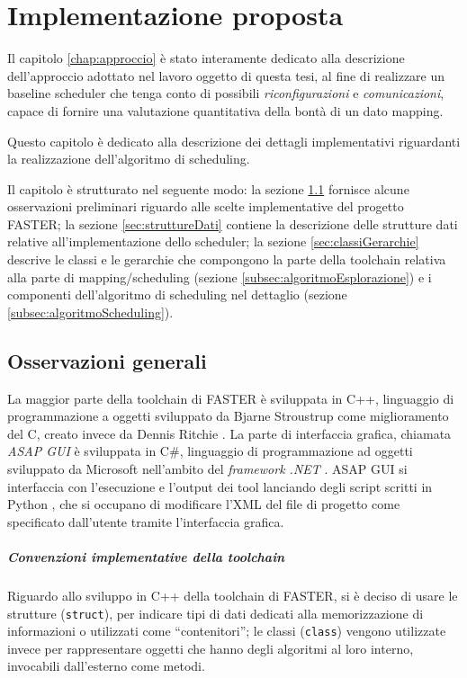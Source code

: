 \chapter{Implementazione proposta}
\label{chap:implementazione}
\vspace{1cm}
Il capitolo \ref{chap:approccio} è stato interamente dedicato alla descrizione 
dell'approccio adottato nel lavoro oggetto di questa tesi, al fine di 
realizzare un baseline scheduler che tenga conto di possibili 
\emph{riconfigurazioni} e \emph{comunicazioni}, capace di fornire una 
valutazione quantitativa della bontà di un dato mapping.

Questo capitolo è dedicato alla descrizione dei dettagli implementativi 
riguardanti la realizzazione dell'algoritmo di scheduling.

Il capitolo è strutturato nel seguente modo: la sezione 
\ref{sec:osservazioniGenerali} fornisce alcune osservazioni preliminari 
riguardo alle scelte implementative del progetto \ac{FASTER}; la sezione 
\ref{sec:struttureDati} contiene la descrizione delle strutture dati relative 
all'implementazione dello scheduler; la sezione \ref{sec:classiGerarchie} 
descrive le classi e le gerarchie che compongono la parte della toolchain 
relativa alla parte di mapping/scheduling (sezione 
\ref{subsec:algoritmoEsplorazione}) e i componenti dell'algoritmo di scheduling 
nel dettaglio (sezione \ref{subsec:algoritmoScheduling}).

\section{Osservazioni generali}
\label{sec:osservazioniGenerali}
La maggior parte della toolchain di \ac{FASTER} è sviluppata in C++, 
linguaggio di programmazione a oggetti sviluppato da Bjarne Stroustrup 
\cite{CppStroustrup} come miglioramento del C, creato invece da Dennis Ritchie 
\cite{CKernighanRitchie}. La parte di interfaccia grafica, chiamata \emph{ASAP 
GUI} è sviluppata in C\#, linguaggio di programmazione ad oggetti sviluppato da 
Microsoft nell'ambito del \emph{framework .NET} \cite{ProCSharp}. ASAP GUI 
si interfaccia con l'esecuzione e l'output dei tool lanciando degli script scritti
in Python \cite{ThinkPython}, che si occupano di modificare l'XML del file di progetto
come specificato dall'utente tramite l'interfaccia grafica.
\paragraph{Convenzioni implementative della toolchain}
Riguardo allo sviluppo in C++ della toolchain di \ac{FASTER}, si è deciso di 
usare le strutture (\verb+struct+), per indicare tipi di dati dedicati alla 
memorizzazione di informazioni o utilizzati come ``contenitori''; le classi 
(\verb+class+) vengono utilizzate invece per rappresentare oggetti che hanno 
degli algoritmi al loro interno, invocabili dall'esterno come metodi.

